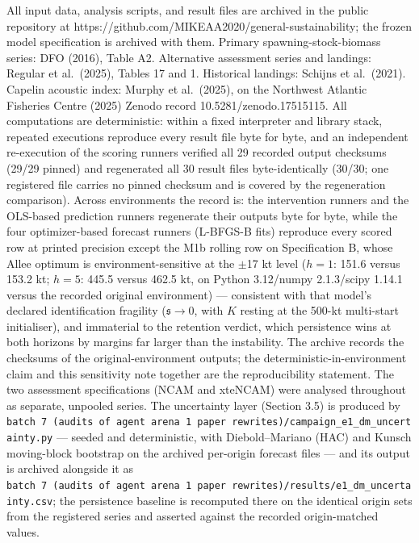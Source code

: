 \documentclass[11pt]{article}
\begin{document}
All input data, analysis scripts, and result files are archived in the
public repository at
https://github.com/MIKEAA2020/general-sustainability; the frozen model
specification is archived with them. Primary spawning-stock-biomass
series: DFO (2016), Table A2. Alternative assessment series and
landings: Regular et al.~(2025), Tables 17 and 1. Historical landings:
Schijns et al.~(2021). Capelin acoustic index: Murphy et al.~(2025), on
the Northwest Atlantic Fisheries Centre (2025) Zenodo record
10.5281/zenodo.17515115. All computations are deterministic: within a
fixed interpreter and library stack, repeated executions reproduce every
result file byte for byte, and an independent re-execution of the
scoring runners verified all 29 recorded output checksums (29/29 pinned)
and regenerated all 30 result files byte-identically (30/30; one
registered file carries no pinned checksum and is covered by the
regeneration comparison). Across environments the record is: the
intervention runners and the OLS-based prediction runners regenerate
their outputs byte for byte, while the four optimizer-based forecast
runners (L-BFGS-B fits) reproduce every scored row at printed precision
except the M1b rolling row on Specification B, whose Allee optimum is
environment-sensitive at the \ensuremath{\pm}17 kt level (\(h=1\): 151.6 versus 153.2
kt; \(h=5\): 445.5 versus 462.5 kt, on Python 3.12/numpy 2.1.3/scipy
1.14.1 versus the recorded original environment) --- consistent with
that model's declared identification fragility (\(\mathfrak s\to 0\), with
\(K\) resting at the 500-kt multi-start initialiser), and immaterial to the retention verdict, which
persistence wins at both horizons by margins far larger than the
instability. The archive records the checksums of the
original-environment outputs; the deterministic-in-environment claim and
this sensitivity note together are the reproducibility statement. The
two assessment specifications (NCAM and xteNCAM) were analysed
throughout as separate, unpooled series. The uncertainty
layer (Section 3.5) is produced by
\texttt{batch\ 7\ (audits\ of\ agent\ arena\ 1\ paper\ rewrites)/campaign\_e1\_dm\_uncertainty.py}
--- seeded and deterministic, with Diebold--Mariano (HAC) and Kunsch
moving-block bootstrap on the archived per-origin forecast files --- and
its output is archived alongside it as
\texttt{batch\ 7\ (audits\ of\ agent\ arena\ 1\ paper\ rewrites)/results/e1\_dm\_uncertainty.csv};
the persistence baseline is recomputed there on the identical origin
sets from the registered series and asserted against the recorded
origin-matched values.
\end{document}
